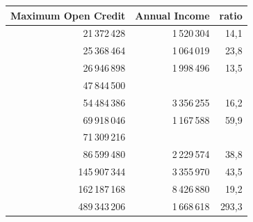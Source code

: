 \begin{tabular}{rrr}
\toprule
\textbf{Maximum Open Credit} & \textbf{Annual Income} & \textbf{ratio} \\
\midrule
21\,372\,428 & 1\,520\,304 & 14,1 \\
25\,368\,464 & 1\,064\,019 & 23,8 \\
26\,946\,898 & 1\,998\,496 & 13,5 \\
47\,844\,500 &  &  \\
54\,484\,386 & 3\,356\,255 & 16,2 \\
69\,918\,046 & 1\,167\,588 & 59,9 \\
71\,309\,216 &  &  \\
86\,599\,480 & 2\,229\,574 & 38,8 \\
145\,907\,344 & 3\,355\,970 & 43,5 \\
162\,187\,168 & 8\,426\,880 & 19,2 \\
489\,343\,206 & 1\,668\,618 & 293,3 \\
\bottomrule
\end{tabular}
